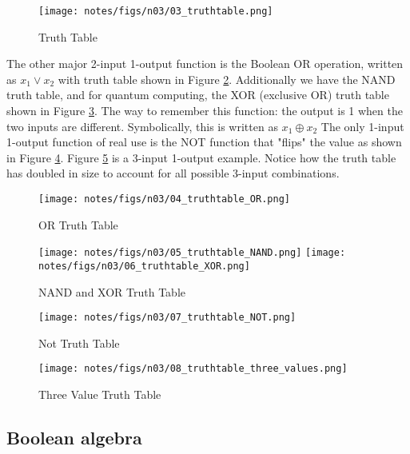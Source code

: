 \documentclass[main.tex]{subfiles}
\begin{document}
\begin{figure}
    \centering
    \texttt{[image: notes/figs/n03/03\_truthtable.png]}
    \caption{Truth Table}
    \label{fig:03_truthtable}
\end{figure}

The other major 2-input 1-output function is the Boolean OR operation, written as $x_{1} \vee x_{2}$ with truth table shown in Figure \ref{fig:04_truthtable_OR}. Additionally we have the NAND truth table, and for quantum computing, the XOR (exclusive OR) truth table shown in Figure \ref{fig:05_truthtable_NAND_and_XOR}. The way to remember this function: the output is 1 when the two inputs are different. Symbolically, this is written as $x_{1} \oplus x_{2}$ The only 1-input 1-output function of real use is the NOT function that "flips" the value as shown in Figure \ref{fig:06_truthtable_NOT}. Figure \ref{fig:07_truthtable_three_values} is a 3-input 1-output example. Notice how the truth table has doubled in size to account for all possible 3-input combinations.

\begin{figure}
    \centering
    \texttt{[image: notes/figs/n03/04\_truthtable\_OR.png]}
    \caption{OR Truth Table}
    \label{fig:04_truthtable_OR}
\end{figure}

\begin{figure}
    \centering
    \texttt{[image: notes/figs/n03/05\_truthtable\_NAND.png]}
    \texttt{[image: notes/figs/n03/06\_truthtable\_XOR.png]}
    \caption{NAND and XOR Truth Table}
    \label{fig:05_truthtable_NAND_and_XOR}
\end{figure}

\begin{figure}
    \centering
    \texttt{[image: notes/figs/n03/07\_truthtable\_NOT.png]}
    \caption{Not Truth Table}
    \label{fig:06_truthtable_NOT}
\end{figure}

\begin{figure}
    \centering
    \texttt{[image: notes/figs/n03/08\_truthtable\_three\_values.png]}
    \caption{Three Value Truth Table}
    \label{fig:07_truthtable_three_values}
\end{figure}

\subsection{Boolean algebra}
\end{document}
